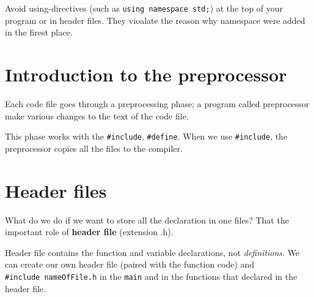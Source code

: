 \documentclass[
  letterpaper,
  DIV=11,
  numbers=noendperiod]{scrreprt}
\begin{document}
\begin{tcolorbox}[enhanced jigsaw, toprule=.15mm, rightrule=.15mm, opacityback=0, breakable, leftrule=.75mm, colback=white, colframe=quarto-callout-warning-color-frame, arc=.35mm, left=2mm, bottomrule=.15mm]
\begin{minipage}[t]{5.5mm}
\textcolor{quarto-callout-warning-color}{\faExclamationTriangle}
\end{minipage}%
\begin{minipage}[t]{\textwidth - 5.5mm}

Avoid using-directives (such as \texttt{using\ namespace\ std;}) at the
top of your program or in header files. They vioalate the reason why
namespace were added in the firest place.

\end{minipage}%
\end{tcolorbox}

\hypertarget{introduction-to-the-preprocessor}{%
\section{Introduction to the
preprocessor}\label{introduction-to-the-preprocessor}}

Each code file goes through a preprocessing phase; a program called
preprocessor make various changes to the text of the code file.

This phase works with the \texttt{\#include}, \texttt{\#define}. When we
use \texttt{\#include}, the preprocessor copies all the files to the
compiler.

\hypertarget{header-files}{%
\section{Header files}\label{header-files}}

What do we do if we want to store all the declaration in one files? That
the important role of \textbf{header file} (extension .h).

Header file contains the function and variable declarations, not
\emph{definitions}. We can create our own header file (paired with the
function code) and \texttt{\#include\ nameOfFile.h} in the \texttt{main}
and in the functions that declared in the header file.
\end{document}
